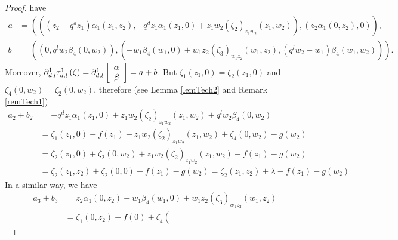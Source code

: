 \documentclass[12pt,reqno]{amsart}%
\theoremstyle{plain}
\numberwithin{theorem}{section} \numberwithin{equation}{section}
\numberwithin{lemma}{section}
\numberwithin{remark}{section}
\numberwithin{example}{section}
\numberwithin{proposition}{section}
\numberwithin{definition}{section}
\numberwithin{corollary}{section}
\begin{document}
\begin{proof}
have
\begin{align*}
a  &  =\left(  \left(  \left(  z_{2}-q^{d}z_{1}\right)  \alpha_{1}\left(
z_{1},z_{2}\right)  ,-q^{d}z_{1}\alpha_{1}\left(  z_{1},0\right)  +z_{1}%
w_{2}\left(  \zeta_{2}\right)  _{z_{1}w_{2}}\left(  z_{1},w_{2}\right)
\right)  ,\left(  z_{2}\alpha_{1}\left(  0,z_{2}\right)  ,0\right)  \right)
,\\
b  &  =\left(  \left(  0,q^{l}w_{2}\beta_{4}\left(  0,w_{2}\right)  \right)
,\left(  -w_{1}\beta_{4}\left(  w_{1},0\right)  +w_{1}z_{2}\left(  \zeta
_{3}\right)  _{w_{1}z_{2}}\left(  w_{1},z_{2}\right)  ,\left(  q^{l}%
w_{2}-w_{1}\right)  \beta_{4}\left(  w_{1},w_{2}\right)  \right)  \right)  .
\end{align*}
Moreover, $\partial_{d,l}^{1}\tau_{d,l}^{1}\left(  \zeta\right)
=\partial_{d,l}^{1}\left[
\begin{array}
[c]{c}%
\alpha\\
\beta
\end{array}
\right]  =a+b$. But $\zeta_{1}\left(  z_{1},0\right)  =\zeta_{2}\left(
z_{1},0\right)  $ and $\zeta_{4}\left(  0,w_{2}\right)  =\zeta_{2}\left(
0,w_{2}\right)  $, therefore (see Lemma \ref{lemTech2} and Remark
\ref{remTech1})
\begin{align*}
a_{2}+b_{2}  &  =-q^{d}z_{1}\alpha_{1}\left(  z_{1},0\right)  +z_{1}%
w_{2}\left(  \zeta_{2}\right)  _{z_{1}w_{2}}\left(  z_{1},w_{2}\right)
+q^{l}w_{2}\beta_{4}\left(  0,w_{2}\right) \\
&  =\zeta_{1}\left(  z_{1},0\right)  -f\left(  z_{1}\right)  +z_{1}%
w_{2}\left(  \zeta_{2}\right)  _{z_{1}w_{2}}\left(  z_{1},w_{2}\right)
+\zeta_{4}\left(  0,w_{2}\right)  -g\left(  w_{2}\right) \\
&  =\zeta_{2}\left(  z_{1},0\right)  +\zeta_{2}\left(  0,w_{2}\right)
+z_{1}w_{2}\left(  \zeta_{2}\right)  _{z_{1}w_{2}}\left(  z_{1},w_{2}\right)
-f\left(  z_{1}\right)  -g\left(  w_{2}\right) \\
&  =\zeta_{2}\left(  z_{1},z_{2}\right)  +\zeta_{2}\left(  0,0\right)
-f\left(  z_{1}\right)  -g\left(  w_{2}\right)  =\zeta_{2}\left(  z_{1}%
,z_{2}\right)  +\lambda-f\left(  z_{1}\right)  -g\left(  w_{2}\right)
\end{align*}
In a similar way, we have
\begin{align*}
a_{3}+b_{3}  &  =z_{2}\alpha_{1}\left(  0,z_{2}\right)  -w_{1}\beta_{4}\left(
w_{1},0\right)  +w_{1}z_{2}\left(  \zeta_{3}\right)  _{w_{1}z_{2}}\left(
w_{1},z_{2}\right) \\
&  =\zeta_{1}\left(  0,z_{2}\right)  -f\left(  0\right)  +\zeta_{4}\left(

\end{align*}
\end{proof}
\end{document}
